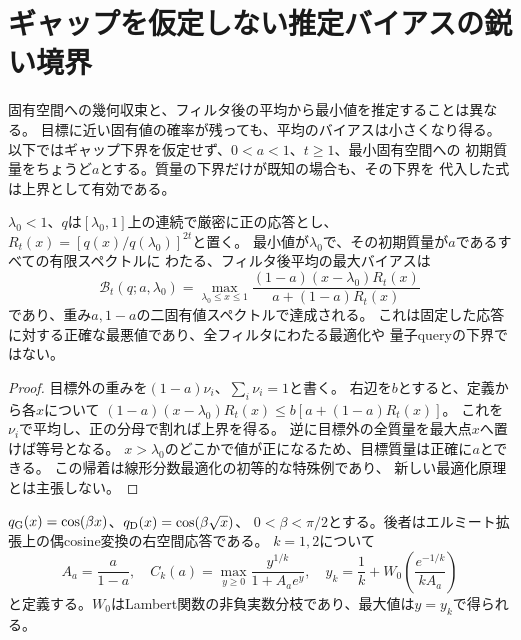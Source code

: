 \section{ギャップを仮定しない推定バイアスの鋭い境界}\label{sec:gapfree}
固有空間への幾何収束と、フィルタ後の平均から最小値を推定することは異なる。
目標に近い固有値の確率が残っても、平均のバイアスは小さくなり得る。
以下ではギャップ下界を仮定せず、$0<a<1$、$t\geq1$、最小固有空間への
初期質量をちょうど$a$とする。質量の下界だけが既知の場合も、その下界を
代入した式は上界として有効である。

\begin{theorem}[正確な二点バイアス包絡]\label{thm:envelope}
$\lambda_0<1$、$q$は$[\lambda_0,1]$上の連続で厳密に正の応答とし、
$R_t(x)=[q(x)/q(\lambda_0)]^{2t}$と置く。
最小値が$\lambda_0$で、その初期質量が$a$であるすべての有限スペクトルに
わたる、フィルタ後平均の最大バイアスは
\begin{equation}\label{eq:envelope}
 \mathcal B_t(q;a,\lambda_0)
 =\max_{\lambda_0\leq x\leq1}
 \frac{(1-a)(x-\lambda_0)R_t(x)}{a+(1-a)R_t(x)}
\end{equation}
であり、重み$a,1-a$の二固有値スペクトルで達成される。
これは固定した応答に対する正確な最悪値であり、全フィルタにわたる最適化や
量子queryの下界ではない。
\end{theorem}
\begin{proof}
目標外の重みを$(1-a)\nu_i$、$\sum_i\nu_i=1$と書く。
右辺を$b$とすると、定義から各$x$について
$(1-a)(x-\lambda_0)R_t(x)\leq b[a+(1-a)R_t(x)]$。
これを$\nu_i$で平均し、正の分母で割れば上界を得る。
逆に目標外の全質量を最大点$x$へ置けば等号となる。
$x>\lambda_0$のどこかで値が正になるため、目標質量は正確に$a$とできる。
この帰着は線形分数最適化\cite{CharnesCooper}の初等的な特殊例であり、
新しい最適化原理とは主張しない。
\end{proof}

$q_{\rm G}(x)=\cos(\beta x)$、$q_{\rm D}(x)=\cos(\beta\sqrt{x})$、
$0<\beta<\pi/2$とする。後者はエルミート拡張上の偶cosine変換の右空間応答である。
$k=1,2$について
\begin{equation}\label{eq:constant}
 A_a=\frac{a}{1-a},\quad
 C_k(a)=\max_{y\geq0}\frac{y^{1/k}}{1+A_a e^y},\quad
 y_k=\frac1k+W_0\!\left(\frac{e^{-1/k}}{kA_a}\right)
\end{equation}
と定義する。$W_0$はLambert関数の非負実数分枝であり、最大値は$y=y_k$で得られる。

